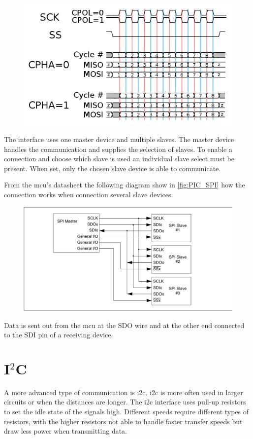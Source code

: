 \begin{figure}[H]
    \centering
    \includegraphics[width=.8\linewidth]{Figures/SPI_timing}
    \label{fig:SPI_timing}
\end{figure}


The interface uses one master device and multiple slaves. The master device handles the communication and supplies the selection of slaves. To enable a connection and choose which slave is used an individual slave select must be present. When set, only the chosen slave device is able to communicate.

From the \gls{mcu}'s datasheet the following diagram show in \autoref{fig:PIC_SPI} how the connection works when connection several slave devices.

\begin{figure}[H]
    \centering
    \includegraphics[width=.8\linewidth]{Figures/PIC_SPI}
    \label{fig:PIC_SPI}
\end{figure}
Data is sent out from the \gls{mcu} at the SDO wire and at the other end connected to the SDI pin of a receiving device. 


\section{I$^2$C}
A more advanced type of communication is \gls{i2c}. \gls{i2c} is more often used in larger circuits or when the distances are longer. The \gls{i2c} interface uses pull-up resistors to set the idle state of the signals high. Different speeds require different types of resistors, with the higher resistors not able to handle faster transfer speeds but draw less power when transmitting data.  

 